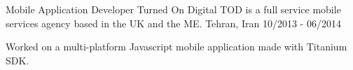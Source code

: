 \begin{cventries}
  \cventry
    {Mobile Application Developer} %
    {Turned On Digital} %
    {TOD is a full service mobile services agency based in the UK and the ME.}
    {Tehran, Iran} %
    {10/2013 - 06/2014} %
    {
      \begin{cvitems} %
        \item {Worked on a multi-platform Javascript mobile application made with Titanium SDK.}
      \end{cvitems}
    }


\end{cventries}


